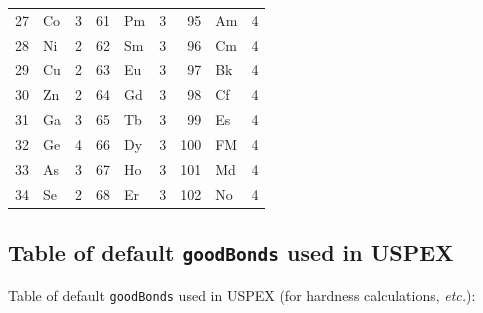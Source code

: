 \documentclass[12pt]{article}
\newcommand{\keyword}[1]{\texttt{#1}}
\begin{document}
\begin{center}
\begin{tabular}{|r|l|c||r|l|c||r|l|c|}
27 & Co  & 3   & 61 & Pm  & 3   &  95 & Am  & 4   \\
28 & Ni  & 2   & 62 & Sm  & 3   &  96 & Cm  & 4   \\
29 & Cu  & 2   & 63 & Eu  & 3   &  97 & Bk  & 4   \\
30 & Zn  & 2   & 64 & Gd  & 3   &  98 & Cf  & 4   \\
31 & Ga  & 3   & 65 & Tb  & 3   &  99 & Es  & 4   \\
32 & Ge  & 4   & 66 & Dy  & 3   & 100 & FM  & 4   \\
33 & As  & 3   & 67 & Ho  & 3   & 101 & Md  & 4   \\
34 & Se  & 2   & 68 & Er  & 3   & 102 & No  & 4   \\
\hline
\end{tabular}
\end{center}


\newpage
\subsection{Table of default \keyword{goodBonds} used in USPEX}
\label{appendix_goodbonds}

Table of default \keyword{goodBonds} used in USPEX (for hardness calculations,
\emph{etc.}):
\end{document}
